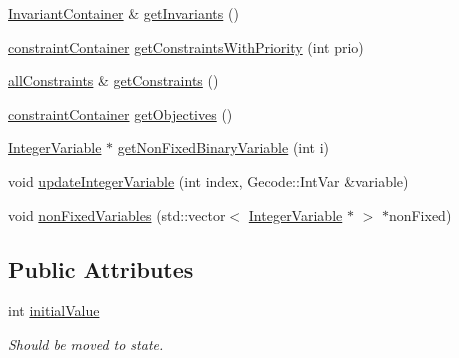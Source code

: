 \begin{DoxyCompactItemize}
\item 
\hyperlink{_constants_8hpp_a5ea9d0c2efe357d2a7f5bcd80cdf179a}{Invariant\-Container} \& \hyperlink{class_model_aabfc3eb2ef3c57060792e45684a951b3}{get\-Invariants} ()
\item 
\hyperlink{_constants_8hpp_a44699d451ee649f131b1b72451070aa0}{constraint\-Container} \hyperlink{class_model_a169afc5a4132e106a9909ebb158f1e97}{get\-Constraints\-With\-Priority} (int prio)
\item 
\hyperlink{_constants_8hpp_a9cd92c30962a3af393035610635972fa}{all\-Constraints} \& \hyperlink{class_model_a84692604aec562f826ecd797f7c9a53e}{get\-Constraints} ()
\item 
\hyperlink{_constants_8hpp_a44699d451ee649f131b1b72451070aa0}{constraint\-Container} \hyperlink{class_model_a3a02bd2477b425dffb18af15541ab08f}{get\-Objectives} ()
\item 
\hyperlink{class_integer_variable}{Integer\-Variable} $\ast$ \hyperlink{class_model_a319b03ca9238413b4120b8edb67099b4}{get\-Non\-Fixed\-Binary\-Variable} (int i)
\item 
void \hyperlink{class_model_aea595e2853bd86b738ef0908137c4a9f}{update\-Integer\-Variable} (int index, Gecode\-::\-Int\-Var \&variable)
\item 
void \hyperlink{class_model_a2f6cc1ee8ac991843a43c9fac4a7da7b}{non\-Fixed\-Variables} (std\-::vector$<$ \hyperlink{class_integer_variable}{Integer\-Variable} $\ast$ $>$ $\ast$non\-Fixed)
\end{DoxyCompactItemize}
\subsection*{Public Attributes}
\begin{DoxyCompactItemize}
\item 
int \hyperlink{class_model_a69256596942801e8a166dabaf9a31114}{initial\-Value}
\begin{DoxyCompactList}\small\item\em Should be moved to state. \end{DoxyCompactList}\end{DoxyCompactItemize}
